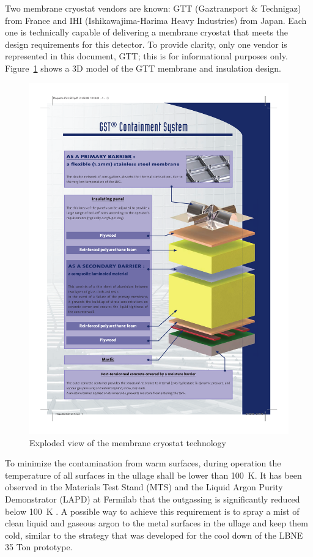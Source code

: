 Two membrane cryostat vendors are known: GTT (Gaztransport \& Technigaz) from France and IHI (Ishikawajima-Harima Heavy Industries) from Japan. Each one is technically capable of delivering a membrane cryostat that meets the design requirements for this detector. To provide clarity, only one vendor is represented in this document, GTT; this is for informational purposes only. Figure~\ref{fig:lar-org} shows a 3D model of the GTT membrane and insulation design.

\begin{figure}[htbp]
\begin{center}
\includegraphics[width=.9\textwidth]{figures/membrane-exploded-view}
\caption[Exploded view of the membrane cryostat technology]{ Exploded view of the membrane cryostat technology}
\label{fig:lar-org}
\end{center}
\end{figure}

To minimize the contamination from warm surfaces, during operation the temperature of all surfaces in the ullage shall be lower than 100~K. 
It has been observed in the Materials Test Stand (MTS) and the Liquid Argon Purity Demonstrator (LAPD) at Fermilab that the outgassing is significantly reduced below 100~K \cite{outgassing}. A possible way to achieve this requirement is to spray a mist of clean liquid and gaseous argon to the metal surfaces in the ullage and keep them cold, similar to the strategy that was developed for the cool down of the LBNE 35 Ton prototype.

